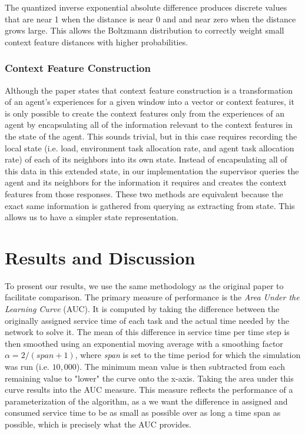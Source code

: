 \documentclass[letterpaper]{article}
\begin{document}
The quantized inverse exponential absolute difference produces discrete values that are near 1 when the distance is near 0 and and near zero when the distance grows large. This allows the Boltzmann distribution to correctly weight small context feature distances with higher probabilities.

\subsubsection{Context Feature Construction}
Although the paper states that context feature construction is a transformation of an agent’s experiences for a given window into a vector or context features, it is only possible to create the context features only from the experiences of an agent by encapsulating all of the information relevant to the context features in the state of the agent. This sounds trivial, but in this case requires recording the local state (i.e. load, environment task allocation rate, and agent task allocation rate) of each of its neighbors into its own state. Instead of encapsulating all of this data in this extended state, in our implementation the supervisor queries the agent and its neighbors for the information it requires and creates the context features from those responses.  These two methods are equivalent because the exact same information is gathered from querying as extracting from state. This allows us to have a simpler state representation.

\section{Results and Discussion}
To present our results, we use the same methodology as the original paper to facilitate comparison. The primary measure of performance is the \textit{Area Under the Learning Curve} (AUC). It is computed by taking the difference between the originally assigned service time of each task and the actual time needed by the network to solve it. The mean of this difference in service time per time step is then smoothed using an exponential moving average with a smoothing factor $\alpha=2/(span+1)$, where \textit{span} is set to the time period for which the simulation was run (i.e. $10,000$). The minimum mean value is then subtracted from each remaining value to "lower" the curve onto the x-axis. Taking the area under this curve results into the AUC measure. This measure reflects the performance of a parameterization of the algorithm, as a we want the difference in assigned and consumed service time to be as small as possible over as long a time span as possible, which is precisely what the AUC provides.
\end{document}
